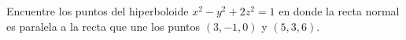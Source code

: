 \item Encuentre los puntos del hiperboloide $x^2 - y^2 + 2z^2 = 1$ en donde la recta normal es paralela a la recta que une los puntos $(3, -1, 0)$ y $(5, 3, 6)$.
